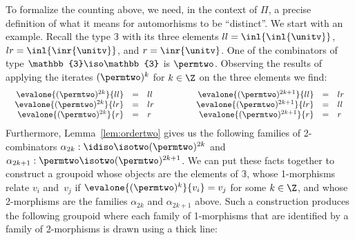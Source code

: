 To formalize the counting above, we need, in the context of $\Pi$, a precise
definition of what it means for automorhisms to be ``distinct''. We start with
an example. Recall the type $\mathbb{3}$ with its three elements
$ll=\inl{\inl{\unitv}}$, $lr=\inl{\inr{\unitv}}$, and $r=\inr{\unitv}$. One of
the combinators of type $\mathbb{3} \iso \mathbb{3}$ is $\permtwo$. Observing
the results of applying the iterates $(\permtwo)^k$ for $k \in \Z$ on the three
elements we find:
\[\begin{array}{c@{\qquad\qquad}c}
\begin{array}{rcl}
\evalone{(\permtwo)^{2k}}{ll} &=& ll \\
\evalone{(\permtwo)^{2k}}{lr} &=& lr \\
\evalone{(\permtwo)^{2k}}{r} &=& r
\end{array} &
\begin{array}{rcl}
\evalone{(\permtwo)^{2k+1}}{ll} &=& lr \\
\evalone{(\permtwo)^{2k+1}}{lr} &=& ll \\
\evalone{(\permtwo)^{2k+1}}{r} &=& r
\end{array}
\end{array}\]
Furthermore, Lemma~\ref{lem:ordertwo} gives us the following families of 2-combinators
$\alpha_{2k} : \idiso \isotwo (\permtwo)^{2k}$ and
$\alpha_{2k+1} : \permtwo \isotwo (\permtwo)^{2k+1}$. We can put these facts together to
construct a groupoid whose objects are the elements of $\mathbb{3}$, whose
1-morphisms relate $v_i$ and~$v_j$ if $\evalone{(\permtwo)^k}{v_i} = v_j$ for some
$k \in \Z$, and whose 2-morphisms are the families $\alpha_{2k}$ and
$\alpha_{2k+1}$ above. Such a construction produces the following groupoid where
each family of 1-morphisms that are identified by a family of 2-morphisms is
drawn using a thick line:

\begin{center}
\end{center}


